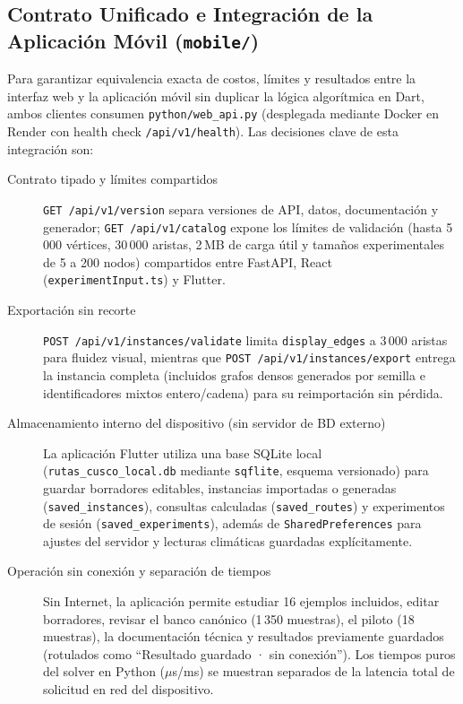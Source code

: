 \subsection{Contrato Unificado e Integración de la Aplicación Móvil (\texttt{mobile/})}
\label{sec:integracion_movil}
Para garantizar equivalencia exacta de costos, límites y resultados entre la interfaz web y la aplicación móvil sin duplicar la lógica algorítmica en Dart, ambos clientes consumen \texttt{python/web\_api.py} (desplegada mediante Docker en Render con health check \texttt{/api/v1/health}). Las decisiones clave de esta integración son:
\begin{description}
    \item[Contrato tipado y límites compartidos] \texttt{GET /api/v1/version} separa versiones de API, datos, documentación y generador; \texttt{GET /api/v1/catalog} expone los límites de validación (hasta 5\,000 vértices, 30\,000 aristas, 2\,MB de carga útil y tamaños experimentales de 5 a 200 nodos) compartidos entre FastAPI, React (\texttt{experimentInput.ts}) y Flutter.
    \item[Exportación sin recorte] \texttt{POST /api/v1/instances/validate} limita \texttt{display\_edges} a 3\,000 aristas para fluidez visual, mientras que \texttt{POST /api/v1/instances/export} entrega la instancia completa (incluidos grafos densos generados por semilla e identificadores mixtos entero/cadena) para su reimportación sin pérdida.
    \item[Almacenamiento interno del dispositivo (sin servidor de BD externo)] La aplicación Flutter utiliza una base SQLite local (\texttt{rutas\_cusco\_local.db} mediante \texttt{sqflite}, esquema versionado) para guardar borradores editables, instancias importadas o generadas (\texttt{saved\_instances}), consultas calculadas (\texttt{saved\_routes}) y experimentos de sesión (\texttt{saved\_experiments}), además de \texttt{SharedPreferences} para ajustes del servidor y lecturas climáticas guardadas explícitamente.
    \item[Operación sin conexión y separación de tiempos] Sin Internet, la aplicación permite estudiar 16 ejemplos incluidos, editar borradores, revisar el banco canónico (1\,350 muestras), el piloto (18 muestras), la documentación técnica y resultados previamente guardados (rotulados como \enquote{Resultado guardado · sin conexión}). Los tiempos puros del solver en Python ($\mu$s/ms) se muestran separados de la latencia total de solicitud en red del dispositivo.
\end{description}


